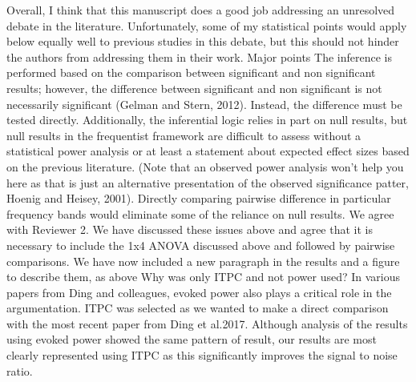 \documentclass[10pt,letterpaper]{article}
\begin{document}
\newline
\noindent

Overall, I think that this manuscript does a good job addressing an unresolved debate in the literature. Unfortunately, some of my statistical points would apply below equally well to previous studies in this debate, but this should not hinder the authors from addressing them in their work. 
\newline
\noindent
Major points 
\newline
\noindent
The inference is performed based on the comparison between significant and non significant results; however, the difference between significant and non significant is not necessarily significant (Gelman and Stern, 2012). Instead, the difference must be tested directly. Additionally, the inferential logic relies in part on null results, but null results in the frequentist framework are difficult to assess without a statistical power analysis or at least a statement about expected effect sizes based on the previous literature. (Note that an observed power analysis won't help you here as that is just an alternative presentation of the observed significance patter, Hoenig and Heisey, 2001). Directly comparing pairwise difference in particular frequency bands would eliminate some of the reliance on null results. 
\color{blue}
We agree with Reviewer 2. We have discussed these issues above and agree that it is necessary to include the 1x4 ANOVA discussed above and followed by pairwise comparisons. We have now included a new paragraph in the results and a figure to describe them, as above 
\color{black}
\newline
\noindent
Why was only ITPC and not power used? In various papers from Ding and colleagues, evoked power also plays a critical role in the argumentation.
\color{blue}
ITPC was selected as we wanted to make a direct comparison with the most recent paper from Ding et al.2017. Although analysis of the results using evoked power showed the same pattern of result, our results are most clearly represented using ITPC as this significantly improves the signal to noise ratio.
\end{document}
